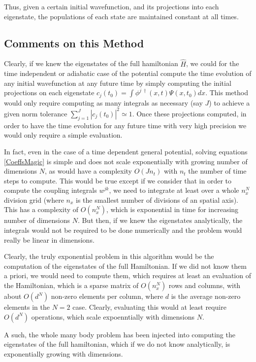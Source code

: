 \documentclass[11pt, a4paper]{article} %
\begin{document}
Thus, given a certain initial wavefunction, and its projections into each eigenstate, the populations of each state are maintained constant at all times.

\subsection{Comments on this Method}
Clearly, if we knew the eigenstates of the full hamiltonian $\hat{H}$, we could for the time independent or adiabatic case of the potential compute the time evolution of any initial wavefunction at any future time by simply computing the initial projections on each eigenstate $c_j(t_0)=\int \phi^{j\ \dagger}(x,t) \Psi(x,t_0)dx$. This method would only require computing as many integrals as necessary (say $J$) to achieve a given norm tolerance $\sum_{j=1}^J |c_j(t_0)|^2\simeq 1$. Once these projections computed, in order to have the time evolution for any future time with very high precision we would only require a simple evaluation. 

In fact, even in the case of a time dependent general potential, solving equations \eqref{CoeffsMagic} is simple and does not scale exponentially with growing number of dimensions $N$, as would have a complexity $O(Jn_t)$ with $n_t$ the number of time steps to compute. This would be true except if we consider that in order to compute the coupling integrals $w^{jk}$, we need to integrate at least over a whole $n_x^N$ division grid (where $n_x$ is the smallest number of divisions of an spatial axis). This has a complexity of $O(n_x^N)$, which is exponential in time for increasing number of dimensions $N$. But then, if we knew the eigenstates analytically, the integrals would not be required to be done numerically and the problem would really be linear in dimensions.

Clearly, the truly exponential problem in this algorithm would be the computation of the eigenstates of the full Hamiltonian. If we did not know them a priori, we would need to compute them, which requires at least an evaluation of the Hamiltonian, which is a sparse matrix of $O(n_x^N)$ rows and columns, with about $O(d^N)$ non-zero elements per column, where $d$ is the average non-zero elements in the $N=2$ case. Clearly, evaluating this would at least require $O(d^N)$ operations, which scale expoenntially with dimensions $N$.

A such, the whole many body problem has been injected into computing the eigenstates of the full hamiltonian, which if we do not know analytically, is exponentially growing with dimensions.
\end{document}
